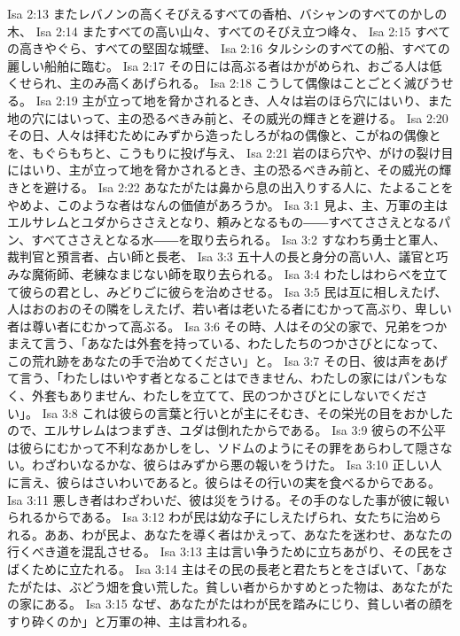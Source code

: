 Isa 2:13  またレバノンの高くそびえるすべての香柏、バシャンのすべてのかしの木、
Isa 2:14  またすべての高い山々、すべてのそびえ立つ峰々、
Isa 2:15  すべての高きやぐら、すべての堅固な城壁、
Isa 2:16  タルシシのすべての船、すべての麗しい船舶に臨む。
Isa 2:17  その日には高ぶる者はかがめられ、おごる人は低くせられ、主のみ高くあげられる。
Isa 2:18  こうして偶像はことごとく滅びうせる。
Isa 2:19  主が立って地を脅かされるとき、人々は岩のほら穴にはいり、また地の穴にはいって、主の恐るべきみ前と、その威光の輝きとを避ける。
Isa 2:20  その日、人々は拝むためにみずから造ったしろがねの偶像と、こがねの偶像とを、もぐらもちと、こうもりに投げ与え、
Isa 2:21  岩のほら穴や、がけの裂け目にはいり、主が立って地を脅かされるとき、主の恐るべきみ前と、その威光の輝きとを避ける。
Isa 2:22  あなたがたは鼻から息の出入りする人に、たよることをやめよ、このような者はなんの価値があろうか。
Isa 3:1  見よ、主、万軍の主はエルサレムとユダからささえとなり、頼みとなるもの――すべてささえとなるパン、すべてささえとなる水――を取り去られる。
Isa 3:2  すなわち勇士と軍人、裁判官と預言者、占い師と長老、
Isa 3:3  五十人の長と身分の高い人、議官と巧みな魔術師、老練なまじない師を取り去られる。
Isa 3:4  わたしはわらべを立てて彼らの君とし、みどりごに彼らを治めさせる。
Isa 3:5  民は互に相しえたげ、人はおのおのその隣をしえたげ、若い者は老いたる者にむかって高ぶり、卑しい者は尊い者にむかって高ぶる。
Isa 3:6  その時、人はその父の家で、兄弟をつかまえて言う、「あなたは外套を持っている、わたしたちのつかさびとになって、この荒れ跡をあなたの手で治めてください」と。
Isa 3:7  その日、彼は声をあげて言う、「わたしはいやす者となることはできません、わたしの家にはパンもなく、外套もありません、わたしを立てて、民のつかさびとにしないでください」。
Isa 3:8  これは彼らの言葉と行いとが主にそむき、その栄光の目をおかしたので、エルサレムはつまずき、ユダは倒れたからである。
Isa 3:9  彼らの不公平は彼らにむかって不利なあかしをし、ソドムのようにその罪をあらわして隠さない。わざわいなるかな、彼らはみずから悪の報いをうけた。
Isa 3:10  正しい人に言え、彼らはさいわいであると。彼らはその行いの実を食べるからである。
Isa 3:11  悪しき者はわざわいだ、彼は災をうける。その手のなした事が彼に報いられるからである。
Isa 3:12  わが民は幼な子にしえたげられ、女たちに治められる。ああ、わが民よ、あなたを導く者はかえって、あなたを迷わせ、あなたの行くべき道を混乱させる。
Isa 3:13  主は言い争うために立ちあがり、その民をさばくために立たれる。
Isa 3:14  主はその民の長老と君たちとをさばいて、「あなたがたは、ぶどう畑を食い荒した。貧しい者からかすめとった物は、あなたがたの家にある。
Isa 3:15  なぜ、あなたがたはわが民を踏みにじり、貧しい者の顔をすり砕くのか」と万軍の神、主は言われる。
